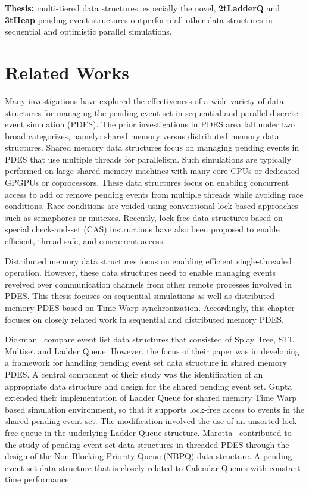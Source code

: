 \textbf{Thesis:} multi-tiered data structures, especially the novel,
\textbf{2tLadderQ} and \textbf{3tHeap} pending event structures
outperform all other data structures in sequential and optimistic
parallel simulations.

\chapter{Related Works}

Many investigations have explored the effectiveness of a wide variety
of data structures for managing the pending event set in sequential
and parallel discrete event simulation (PDES).  The prior
investigations in PDES area fall under two broad categorizes, namely:
shared memory versus distributed memory data structures.  Shared
memory data structures focus on managing pending events in PDES that
use multiple threads for parallelism.  Such simulations are typically
performed on large shared memory machines with many-core CPUs or
dedicated GPGPUs or coprocessors.  These data structures focus on
enabling concurrent access to add or remove pending events from
multiple threads while avoiding race conditions.  Race conditions are
voided using conventional lock-based approaches such as semaphores or
mutexes.  Recently, lock-free data structures based on special
check-and-set (CAS) instructions have also been proposed to enable
efficient, thread-safe, and concurrent access.

Distributed memory data structures focus on enabling efficient
single-threaded operation.  However, these data structures need to
enable managing events reveived over communication channels from other
remote processes involved in PDES.  This thesis focuses on sequential
simulations as well as distributed memory PDES based on Time Warp
synchronization.  Accordingly, this chapter focuses on closely related
work in sequential and distributed memory PDES.

Dickman~\cite{dickman-13} compare event list data structures that
consisted of Splay Tree, STL Multiset and Ladder Queue. However, the
focus of their paper was in developing a framework for handling
pending event set data structure in shared memory PDES. A central
component of their study was the identification of an appropriate data
structure and design for the shared pending event
set. Gupta~\cite{gupta-14} extended their implementation of Ladder
Queue for shared memory Time Warp based simulation environment, so
that it supports lock-free access to events in the shared pending
event set. The modification involved the use of an unsorted lock-free
queue in the underlying Ladder Queue
structure. Marotta~\cite{marotta-16} contributed to the study of
pending event set data structures in threaded PDES through the design
of the Non-Blocking Priority Queue (NBPQ) data structure. A pending
event set data structure that is closely related to Calendar Queues
with constant time performance.

